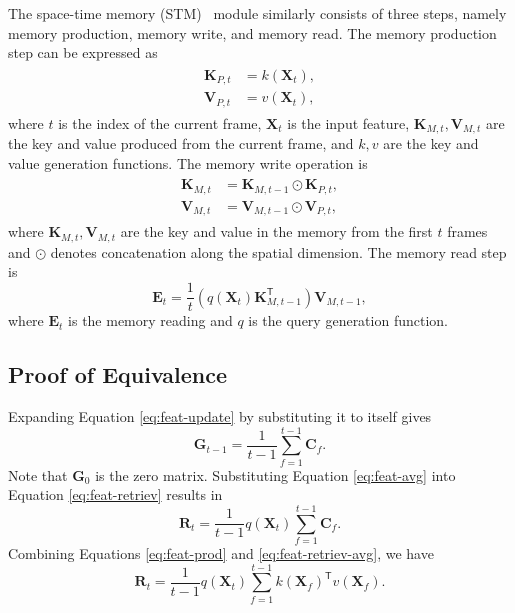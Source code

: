 \documentclass[runningheads]{llncs}
\begin{document}
The space-time memory (STM)~\cite{stm} module similarly consists of three steps, namely memory production, memory write, and memory read. The memory production step can be expressed as
\begin{align}
\begin{split}
\label{eq:mem-prod}
    \bm{K}_{P, t} &= k(\bm{X}_t),\\
    \bm{V}_{P, t} &= v(\bm{X}_t),
\end{split}
\end{align}
where $t$ is the index of the current frame, $\bm{X}_t$ is the input feature, $\bm{K}_{M, t}, \bm{V}_{M, t}$ are the key and value produced from the current frame, and $k, v$ are the key and value generation functions. The memory write operation is
\begin{align}
\begin{split}
\label{eq:mem-write}
    \bm{K}_{M, t} &= \bm{K}_{M, t - 1} \odot \bm{K}_{P, t},\\
    \bm{V}_{M, t} &= \bm{V}_{M, t - 1} \odot \bm{V}_{P, t},
\end{split}
\end{align}
where $\bm{K}_{M, t}, \bm{V}_{M, t}$ are the key and value in the memory from the first $t$ frames and $\odot$ denotes concatenation along the spatial dimension. The memory read step is
\begin{equation}
\label{eq:mem-read}
    \bm{E}_t = \frac{1}{t}\left(q(\bm{X}_t)\bm{K}_{M, t - 1}^\mathsf{T}\right)\bm{V}_{M, t - 1},
\end{equation}
where $\bm{E}_t$ is the memory reading and $q$ is the query generation function.

\subsection{Proof of Equivalence}

Expanding Equation \eqref{eq:feat-update} by substituting it to itself gives
\begin{equation}
\label{eq:feat-avg}
    \bm{G}_{t - 1} = \frac{1}{t - 1}\sum_{f = 1}^{t - 1}{\bm{C}_f}.
\end{equation}
Note that $\bm{G}_0$ is the zero matrix. Substituting Equation \eqref{eq:feat-avg} into Equation \eqref{eq:feat-retriev} results in
\begin{equation}
\label{eq:feat-retriev-avg}
    \bm{R}_t = \frac{1}{t - 1}q(\bm{X}_t)\sum_{f = 1}^{t - 1}{\bm{C}_f}.
\end{equation}
Combining Equations \eqref{eq:feat-prod} and \eqref{eq:feat-retriev-avg}, we have
\begin{equation}
\label{eq:feat-all}
    \bm{R}_t = \frac{1}{t - 1}q(\bm{X}_t)\sum_{f = 1}^{t - 1}{k(\bm{X}_f)^\mathsf{T}v(\bm{X}_f)}.
\end{equation}
\end{document}
